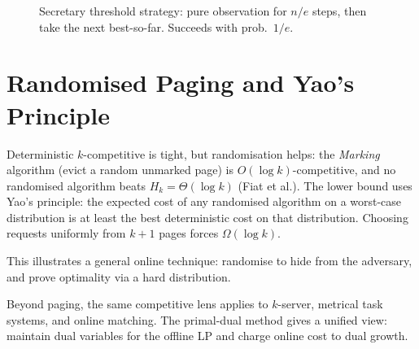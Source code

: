 \begin{figure}[h]\centering
{}
\caption{Secretary threshold strategy: pure observation for $n/e$ steps, then take the next best-so-far. Succeeds with prob.\ $1/e$.}
\label{fig:secretary}
\end{figure}

\section{Randomised Paging and Yao's Principle}
\label{sec:rand-paging}

Deterministic $k$-competitive is tight, but randomisation helps: the \emph{Marking} algorithm (evict a random unmarked page) is $O(\log k)$-competitive, and no randomised algorithm beats $H_k=\Theta(\log k)$ (Fiat et al.). The lower bound uses Yao's principle: the expected cost of any randomised algorithm on a worst-case distribution is at least the best deterministic cost on that distribution. Choosing requests uniformly from $k+1$ pages forces $\Omega(\log k)$.

This illustrates a general online technique: randomise to hide from the adversary, and prove optimality via a hard distribution.

Beyond paging, the same competitive lens applies to $k$-server, metrical task systems, and online matching. The primal-dual method gives a unified view: maintain dual variables for the offline LP and charge online cost to dual growth.


